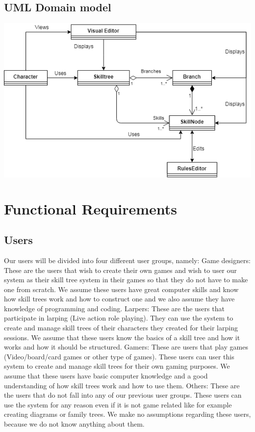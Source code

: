 \documentclass{article}
\begin{document}
  \subsection{UML Domain model}
  \includegraphics{TriiDomainModel}
  
\section{Functional Requirements}
  \subsection{Users}
  Our users will be divided into four different user groups, namely:\newline\newline
  Game designers: These are the users that wish to create their own games and wish to user our system as their skill tree system in their games so that they do not have to make one from scratch. We assume these users have great computer skills and know how skill trees work and how to construct one and we also assume they have knowledge of programming and coding.\newline\newline
  Larpers: These are the users that participate in larping (Live action role playing). They can use the system to create and manage skill trees of their characters they created for their larping sessions. We assume that these users know the basics of a skill tree and how it works and how it should be structured.\newline\newline
  Gamers: These are users that play games (Video/board/card games or other type of games). These users can user this system to create and manage skill trees for their own gaming purposes. We assume that these users have basic computer knowledge and a good understanding of how skill trees work and how to use them.\newline\newline
  Others: These are the users that do not fall into any of our previous user groups. These users can use the system for any reason even if it is not game related like for example creating diagrams or family trees. We make no assumptions regarding these users, because we do not know anything about them.
\end{document}

